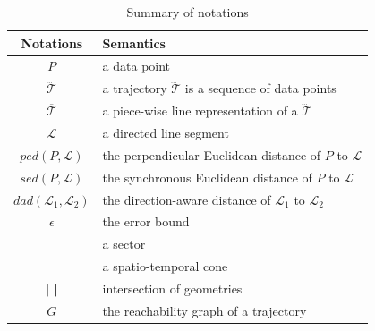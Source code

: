 	\begin{table}
		\renewcommand{\arraystretch}{1.20}
		\vspace{-1ex}
		\caption{\small Summary of notations}
		\centering
		\small
		\begin{tabular}{|c|l|}
			\hline
			{\bf Notations}& {\bf Semantics}   \\		\hline %
			$P$ & a data point \\		\hline
			$\dddot{\mathcal{T}}$ & a trajectory $\dddot{\mathcal{T}}$ is a sequence of data points\\		\hline
			$\overline{\mathcal{T}}$&  {a piece-wise line representation of a $\dddot{\mathcal{T}}$}	\\		\hline
			$\mathcal{L}$ & a directed line segment  \\		\hline
			$ped(P, \mathcal{L})$ &  {the perpendicular Euclidean distance of $P$ to $\mathcal{L}$}	\\	\hline
			$sed(P, \mathcal{L})$ & {the synchronous Euclidean distance of $P$ to $\mathcal{L}$} 	\\		\hline
			$dad(\mathcal{L}_1, \mathcal{L}_2)$ & {the direction-aware distance of $\mathcal{L}_1$ to $\mathcal{L}_2$} 	\\		\hline
			$\epsilon$ & the error bound \\		\hline
			\sector{} & a sector \\		\hline
			\cone{} & a spatio-temporal cone \\		\hline
			$\bigsqcap$ & intersection of geometries\\		\hline
			$G$ &	the reachability graph of a trajectory\\		\hline
		\end{tabular}
		\label{tab:notations}
		\vspace{-1ex}
	\end{table}


